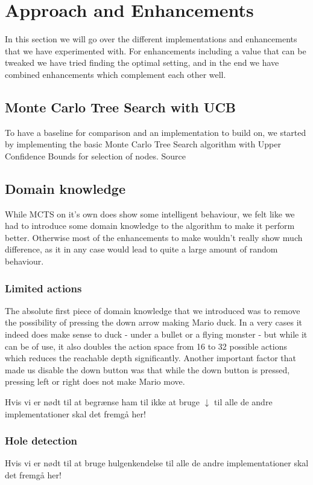 \documentclass[10pt,a4paper]{article}
\begin{document}
\section{Approach and Enhancements}
In this section we will go over the different implementations and enhancements that we have experimented with. For enhancements including a value that can be tweaked we have tried finding the optimal setting, and in the end we have combined enhancements which complement each other well.

\subsection{Monte Carlo Tree Search with UCB}
To have a baseline for comparison and an implementation to build on, we started by implementing the basic Monte Carlo Tree Search algorithm with Upper Confidence Bounds for selection of nodes.
Source \cite{mctssurvey}
\subsection{Domain knowledge}
While MCTS on it's own does show some intelligent behaviour, we felt like we had to introduce some domain knowledge to the algorithm to make it perform better. Otherwise most of the enhancements to make wouldn't really show much difference, as it in any case would lead to quite a large amount of random behaviour.
\subsubsection{Limited actions}


The absolute first piece of domain knowledge that we introduced was to remove the possibility of pressing the down arrow making Mario duck. In a very cases it indeed does make sense to duck - under a bullet or a flying monster - but while it can be of use, it also doubles the action space from 16 to 32 possible actions which reduces the reachable depth significantly.
Another important factor that made us disable the down button was that while the down button is pressed, pressing left or right does not make Mario move. %


Hvis vi er nødt til at begrænse ham til ikke at bruge $\downarrow$ til alle de andre implementationer skal det fremgå her!
\subsubsection{Hole detection}
Hvis vi er nødt til at bruge hulgenkendelse til alle de andre implementationer skal det fremgå her!
\end{document}
